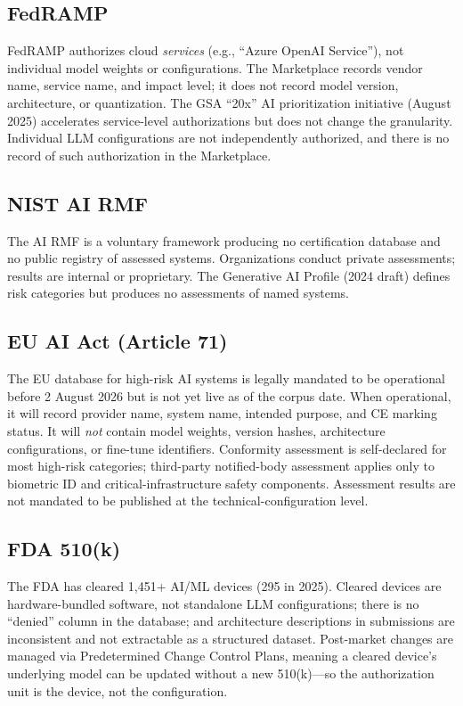 \documentclass{article} %
\begin{document}
\subsection*{FedRAMP}
FedRAMP authorizes cloud \emph{services} (e.g., ``Azure OpenAI Service''), not individual model weights or configurations.
The Marketplace records vendor name, service name, and impact level; it does not record model version, architecture, or quantization.
The GSA ``20x'' AI prioritization initiative (August 2025) accelerates service-level authorizations but does not change the granularity.
Individual LLM configurations are not independently authorized, and there is no record of such authorization in the Marketplace.

\subsection*{NIST AI RMF}
The AI RMF is a voluntary framework producing no certification database and no public registry of assessed systems.
Organizations conduct private assessments; results are internal or proprietary.
The Generative AI Profile (2024 draft) defines risk categories but produces no assessments of named systems.

\subsection*{EU AI Act (Article 71)}
The EU database for high-risk AI systems is legally mandated to be operational before 2 August 2026 but is not yet live as of the corpus date.
When operational, it will record provider name, system name, intended purpose, and CE marking status.
It will \emph{not} contain model weights, version hashes, architecture configurations, or fine-tune identifiers.
Conformity assessment is self-declared for most high-risk categories; third-party notified-body assessment applies only to biometric ID and critical-infrastructure safety components.
Assessment results are not mandated to be published at the technical-configuration level.

\subsection*{FDA 510(k)}
The FDA has cleared 1{,}451+ AI/ML devices (295 in 2025).
Cleared devices are hardware-bundled software, not standalone LLM configurations; there is no ``denied'' column in the database; and architecture descriptions in submissions are inconsistent and not extractable as a structured dataset.
Post-market changes are managed via Predetermined Change Control Plans, meaning a cleared device's underlying model can be updated without a new 510(k)---so the authorization unit is the device, not the configuration.
\end{document}
